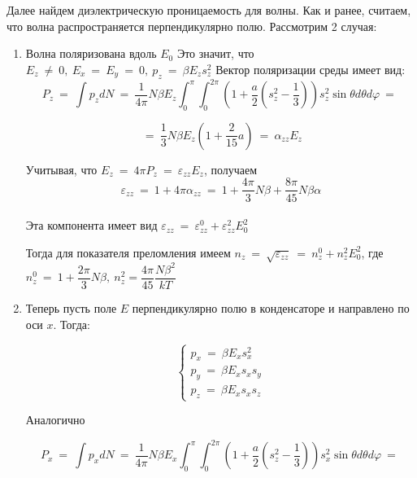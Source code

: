 \documentclass[a4paper, 12pt]{article}
\renewcommand{\phi}{\varphi}
\newcommand{\eps}{\varepsilon}
\begin{document}
    Далее найдем диэлектрическую проницаемость для волны. Как и ранее, считаем, что волна распространяется перпендикулярно полю. Рассмотрим 2 случая:\\
    
    \begin{enumerate}
        \item Волна поляризована вдоль $E_0$
              Это значит, что $E_z ~\neq~ 0,~ E_x ~=~ E_y ~=~ 0,~ p_z ~=~ \beta E_z s_z^2$
              Вектор поляризации среды имеет вид:
              \begin{equation*}
                P_z ~=~ \int p_z dN ~=~ \dfrac{1}{4 \pi} N \beta E_z \int_0^{\pi} \int_0^{2 \pi} \left( 1 + \dfrac{a}{2} \left( s_z^2 - \dfrac{1}{3} \right) \right) s_z^2 \sin \theta d \theta d \phi ~=~
              \end{equation*}

              \begin{equation*}
                ~=~ \dfrac{1}{3} N \beta E_z \left( 1 + \dfrac{2}{15} a \right) ~=~ \alpha_{zz} E_z
              \end{equation*}

              Учитывая, что $E_z ~=~ 4 \pi P_z ~=~ \eps_{zz} E_z$, получаем
              \[
                  \eps_{zz} ~=~ 1 + 4 \pi \alpha_{zz} ~=~ 1 + \dfrac{4 \pi}{3} N \beta + \dfrac{8 \pi}{45} N \beta \alpha
              \]\\

              Эта компонента имеет вид $\eps_{zz} ~=~ \eps_{zz}^0 + \eps_{zz}^2 E_0^2$

              Тогда для показателя преломления имеем $n_z ~=~ \sqrt{\eps_{zz}} ~=~ n_z^0 + n_z^2 E_0^2$, где $n_z^0 ~=~ 1 + \dfrac{2 \pi}{3}N \beta,~ n_z^2 = \dfrac{4 \pi}{45} \dfrac{N \beta^2}{k T}$

        \item Теперь пусть поле $E$ перпендикулярно полю в конденсаторе и направлено по оси $x$. Тогда:
        
              \[
                  \begin{cases}
                      p_x ~=~ \beta E_x s_x^2 \\
                      p_y ~=~ \beta E_x s_x s_y \\
                      p_z ~=~ \beta E_x s_x s_z
                  \end{cases}
              \]

              Аналогично

              \[
                  P_x ~=~ \int p_x dN ~=~ \dfrac{1}{4 \pi} N \beta E_x \int_0^{\pi} \int_0^{2 \pi} \left( 1 + \dfrac{a}{2} \left( s_z^2 - \dfrac{1}{3} \right) \right) s_x^2 \sin \theta d \theta d \phi ~=~
              \]


\end{enumerate}
\end{document}
